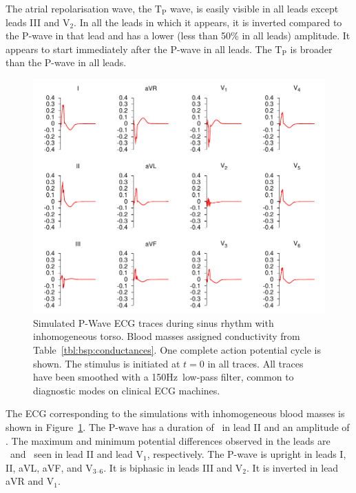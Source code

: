 The atrial repolarisation wave, the $\text{T}_{\text{P}}$ wave, is easily
visible in all leads except leads III and $\text{V}_{\text{2}}$.
In all the leads in which it appears, it is inverted compared to the P-wave in
that lead and has a lower (less than 50\% in all leads) amplitude.
It appears to start immediately after the P-wave in all leads.
The $\text{T}_{\text{P}}$ is broader than the P-wave in all leads.


\begin{figure}
\includegraphics{figures/bsp/ecg_blood_150Hz}
\caption[12 lead ECG during sinus rhythm, bloodmasses present.]{
\label{bsp:fig:ecg_blood}
Simulated P-Wave ECG traces during sinus rhythm with inhomogeneous torso.
Blood masses assigned conductivity from Table~\ref{tbl:bsp:conductances}.
One complete action potential cycle is shown.
The stimulus is initiated at $t = 0$ in all traces.
All traces have been smoothed with a \unit{150}{Hz}\ low-pass filter, common to
diagnostic modes on clinical ECG machines.
}
\end{figure}

The ECG corresponding to the simulations with inhomogeneous blood masses is shown in
Figure~\ref{bsp:fig:ecg_blood}.
The P-wave has a duration of \ in lead II and an amplitude of .
The maximum and minimum potential differences observed in the leads are
\ and \ seen in lead II and lead $\text{V}_{\text{1}}$, respectively.
The P-wave is upright in leads I, II, aVL, aVF, and $\text{V}_{\text{3--6}}$.
It is biphasic in leads III and $\text{V}_{\text{2}}$.
It is inverted in lead aVR and $\text{V}_{\text{1}}$.

